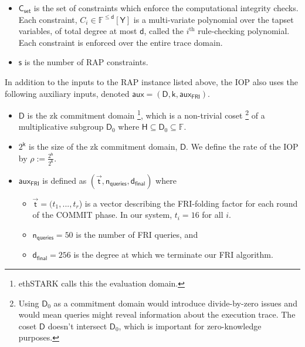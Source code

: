 \documentclass[10pt,letterpaper,titlepage]{article}
\theoremstyle{definition}
\begin{document}
\begin{itemize}
  \item $\mathsf{C}_\mathsf{set}$ is the set of constraints which enforce the computational integrity checks.
  Each constraint, $C_i\in\mathbb{F}^{\leq \mathsf{d}}[\mathsf{Y}]$ is a multi-variate polynomial over the tapset variables, of total degree at most $\mathsf{d}$, called the $i^\text{th}$ rule-checking polynomial.
  Each constraint is enforced over the entire trace domain.
  \item $\mathsf{s}$ is the number of RAP constraints.
\end{itemize}
In addition to the inputs to the RAP instance listed above, the IOP also uses the following auxiliary inputs, denoted $\mathsf{aux}=(\mathsf{D},\mathsf{k},\mathsf{aux}_\mathsf{FRI})$.
\begin{itemize}
  \item $\mathsf{D}$ is the zk commitment domain%
  \footnote{ethSTARK calls this the evaluation domain.}, which is a non-trivial coset%
  \footnote{Using $\mathsf{D}_0$ as a commitment domain would introduce divide-by-zero issues and would mean queries might reveal information about the execution trace.
  The coset $\mathsf{D}$ doesn't intersect $\mathsf{D}_0$, which is important for zero-knowledge purposes.}
  of a multiplicative subgroup $\mathsf{D}_0$ where $\mathsf{H}\subseteq\mathsf{D}_0\subseteq\mathbb{F}$.
  \item $2^\mathsf{k}$ is the size of the zk commitment domain, $\mathsf{D}$.
  We define the rate of the IOP by $\rho := \frac{2^\mathsf{h}}{2^\mathsf{k}}$.
  \item $\mathsf{aux}_\mathsf{FRI}$ is defined as $(\vec{\mathsf{t}},\mathsf{n_{queries}}, \mathsf{d_{final}})$ where
    \begin{itemize}
      \item $\vec{\mathsf{t}}=(t_1,...,t_r$) is a vector describing the FRI-folding factor for each round of the COMMIT phase. In our system, $t_i=16$ for all $i$.
      \item $\mathsf{n_{queries}}=50$ is the number of FRI queries, and
      \item $\mathsf{d_{final}}=256$ is the degree at which we terminate our FRI algorithm.
    \end{itemize}
\end{itemize}
\end{document}
